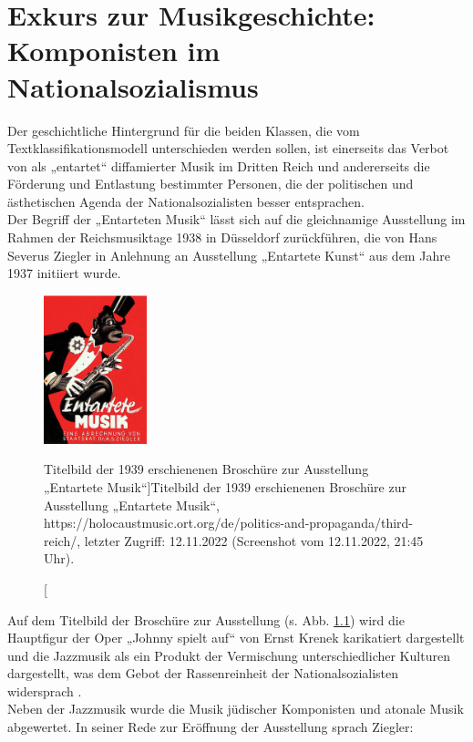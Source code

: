 \documentclass[ngerman]{ttlab-qualify}
\begin{document}
\chapter{Exkurs zur Musikgeschichte: Komponisten im Nationalsozialismus} \label{Exkurs}
Der geschichtliche Hintergrund für die beiden Klassen, die vom Textklassifikationsmodell unterschieden werden sollen, ist einerseits das Verbot von als „entartet“ diffamierter Musik im Dritten Reich und andererseits die Förderung und Entlastung bestimmter Personen, die der politischen und ästhetischen Agenda der Nationalsozialisten besser entsprachen.\\
Der Begriff der „Entarteten Musik“ lässt sich auf die gleichnamige Ausstellung im Rahmen der Reichsmusiktage 1938 in Düsseldorf zurückführen, die von Hans Severus Ziegler in Anlehnung an Ausstellung „Entartete Kunst“ aus dem Jahre 1937 initiiert wurde. 
\begin{figure}[H]
\begin{center}
\includegraphics[width=3cm]{grafiken/Entartete_Musik.png}
\caption[Titelbild der 1939 erschienenen Broschüre zur Ausstellung „Entartete Musik“]{Titelbild der 1939 erschienenen Broschüre zur Ausstellung „Entartete Musik“,\\ https://holocaustmusic.ort.org/de/politics-and-propaganda/third-reich/, letzter Zugriff: 12.11.2022 (Screenshot vom 12.11.2022, 21:45 Uhr)}.
\label{bild:verfolgt}
\end{center}
\end{figure}
\noindent Auf dem Titelbild der Broschüre zur Ausstellung (s. Abb. \ref{bild:verfolgt}) wird die Hauptfigur der Oper „Johnny spielt auf“ von Ernst Krenek karikatiert dargestellt und die Jazzmusik als ein Produkt der Vermischung unterschiedlicher Kulturen dargestellt, was dem Gebot der Rassenreinheit der Nationalsozialisten widersprach \parencite{saxophon}.\\ Neben der Jazzmusik wurde die Musik jüdischer Komponisten und atonale Musik abgewertet. 
In seiner Rede zur Eröffnung der Ausstellung sprach Ziegler: 
\end{document}
